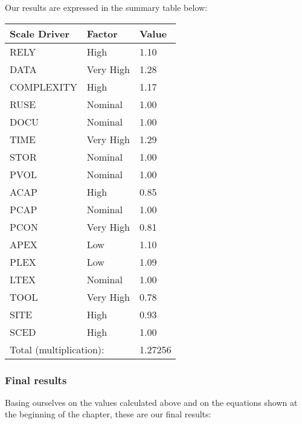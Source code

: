 		
\vspace{2cm}


Our results are expressed in the summary table below: 


	\begin{center}
		\begin{tabular}{|l|l|l|}
			\hline
			\textbf{Scale Driver} & \textbf{Factor} & \textbf{Value}\\ \hline
		
			RELY & High & 1.10\\
			DATA & Very High & 1.28\\
			COMPLEXITY & High & 1.17\\
			RUSE & Nominal & 1.00\\
			DOCU & Nominal & 1.00\\ \hline
			
			TIME & Very High & 1.29\\
			STOR & Nominal & 1.00\\
			PVOL & Nominal & 1.00\\ \hline
			
			ACAP & High & 0.85\\
			PCAP & Nominal & 1.00\\
			PCON & Very High & 0.81\\
			APEX & Low & 1.10\\
			PLEX & Low & 1.09\\
			LTEX & Nominal & 1.00\\ \hline
			
			TOOL & Very High & 0.78\\
			SITE & High & 0.93\\
			SCED & High & 1.00\\ \hline	
			
			\multicolumn{2}{|l|}{Total (multiplication):} & 1.27256\\ \hline
		\end{tabular}
	\end{center}
	
	
	\subsubsection{Final results}
	
	Basing ourselves on the values calculated above and on the equations shown at the beginning of the chapter, these are our final results: \\
	
	